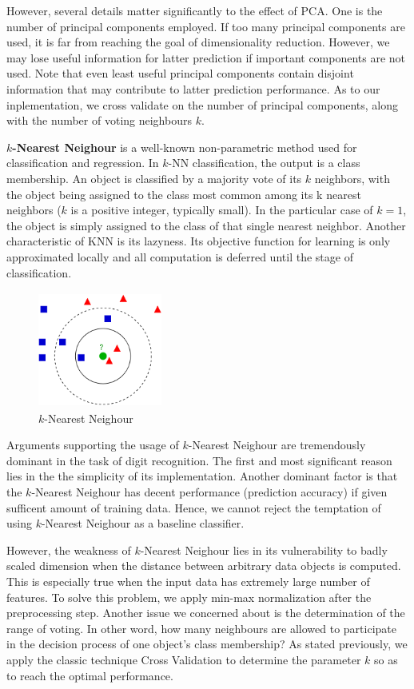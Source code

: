 \documentclass{article} %
\begin{document}
\newcommand{\knn}{$k$-Nearest Neighour }
However, several details matter significantly to the effect of PCA. One is the number
of principal components employed. If too many principal components are used,
it is far from reaching the goal of dimensionality reduction. However, we may
lose useful information for latter prediction if important components are not
used. Note that even least useful principal components contain disjoint information
that may contribute to latter prediction performance. As to our
inplementation, we cross validate on the number of principal components, along
with the number of voting neighbours $k$.

{\bf \knn} is a well-known non-parametric method used for classification and regression.
In $k$-NN classification, the output is a class membership. An object is
classified by a majority vote of its $k$ neighbors, with the object being assigned
to the class most common among its k nearest neighbors ($k$ is a positive
integer, typically small). In the particular case of $k = 1$, the object is
simply assigned to the class of that single nearest neighbor. Another
characteristic of KNN is its lazyness. Its objective function for learning is
only approximated locally and all computation is deferred until the stage of
classification.

\begin{figure}[h]
    \centering
    \includegraphics[height=1.5in,width=1.6in]{./images/KNN.png}
    \caption{\knn }
\end{figure}
Arguments supporting the usage of \knn are tremendously
dominant in the task of digit recognition. The first and most significant
reason lies in the the simplicity of its implementation. Another dominant factor is 
that the \knn  has decent performance (prediction accuracy) if given sufficent
amount of training data. Hence, we cannot reject the temptation of using \knn
as a baseline classifier.

However, the weakness of \knn lies in its vulnerability to badly scaled
dimension when the distance between arbitrary data objects is computed. This
is especially true when the input data has extremely large number of features.
To solve this problem, we apply min-max normalization after the preprocessing
step. Another issue we concerned about is the determination of the range of
voting. In other word, how many neighbours are allowed to participate in the
decision process of one object's class membership? As stated previously, we
apply the classic technique Cross Validation to determine the parameter $k$ so
as to reach the optimal performance.
\end{document}
